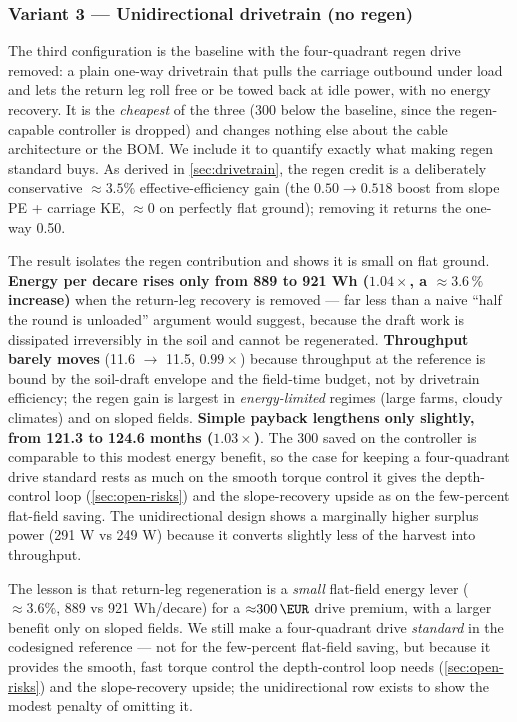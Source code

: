 \documentclass[11pt,a4paper]{article}
\begin{document}
\subsubsection{Variant 3 --- Unidirectional drivetrain (no regen)}\label{sec:variant-norering}

The third configuration is the baseline with the four-quadrant regen drive removed: a plain one-way drivetrain that pulls the carriage outbound under load and lets the return leg roll free or be towed back at idle power, with no energy recovery. It is the \emph{cheapest} of the three (\SI{300}{\EUR} below the baseline, since the regen-capable controller is dropped) and changes nothing else about the cable architecture or the BOM. We include it to quantify exactly what making regen standard buys. As derived in \cref{sec:drivetrain}, the regen credit is a deliberately conservative ${\approx}3.5\%$ effective-efficiency gain (the $0.50 \to 0.518$ boost from slope PE + carriage KE, ${\approx}0$ on perfectly flat ground); removing it returns the one-way 0.50.

The result isolates the regen contribution and shows it is small on flat ground. \textbf{Energy per decare rises only from 889 to 921 Wh ($1.04\times$, a ${\approx}3.6\,\%$ increase)} when the return-leg recovery is removed --- far less than a naive ``half the round is unloaded'' argument would suggest, because the draft work is dissipated irreversibly in the soil and cannot be regenerated. \textbf{Throughput barely moves} (11.6 $\to$ 11.5, $0.99\times$) because throughput at the reference is bound by the soil-draft envelope and the field-time budget, not by drivetrain efficiency; the regen gain is largest in \emph{energy-limited} regimes (large farms, cloudy climates) and on sloped fields. \textbf{Simple payback lengthens only slightly, from 121.3 to 124.6 months ($1.03\times$)}. The \SI{300}{\EUR} saved on the controller is comparable to this modest energy benefit, so the case for keeping a four-quadrant drive standard rests as much on the smooth torque control it gives the depth-control loop (\cref{sec:open-risks}) and the slope-recovery upside as on the few-percent flat-field saving. The unidirectional design shows a marginally higher surplus power (291 W vs 249 W) because it converts slightly less of the harvest into throughput.

The lesson is that return-leg regeneration is a \emph{small} flat-field energy lever (${\approx}3.6\%$, 889 vs 921 Wh/decare) for a ${\approx}\SI{300}{\EUR}$ drive premium, with a larger benefit only on sloped fields. We still make a four-quadrant drive \emph{standard} in the codesigned reference --- not for the few-percent flat-field saving, but because it provides the smooth, fast torque control the depth-control loop needs (\cref{sec:open-risks}) and the slope-recovery upside; the unidirectional row exists to show the modest penalty of omitting it.
\end{document}
